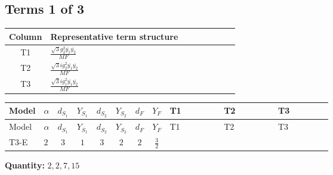 \documentclass[8pt]{article}
\begin{document}
\begin{landscape}
\subsection*{Terms 1 of 3}
\begin{center}
\begin{tabular}{@{}c >{\raggedright\arraybackslash}p{0.82\linewidth}@{}}
\toprule
Column & Representative term structure \\
\midrule
T1 & \(\displaystyle \frac{\sqrt{3} g_{2}^{2} \overline{y_{1}} \overline{y_{2}}}{MF}\) \\
\midrule
T2 & \(\displaystyle \frac{\sqrt{3} i g_{2}^{2} \overline{y_{1}} \overline{y_{2}}}{MF}\) \\
\midrule
T3 & \(\displaystyle \frac{\sqrt{3} i g_{1}^{2} \overline{y_{1}} \overline{y_{2}}}{MF}\) \\
\midrule
\bottomrule
\end{tabular}
\end{center}
\smallskip
\tiny
\begin{longtable}{@{}llcccccc >{\raggedright\arraybackslash}p{0.21\linewidth} >{\raggedright\arraybackslash}p{0.21\linewidth} >{\raggedright\arraybackslash}p{0.21\linewidth}@{}}
\toprule
Model & $\alpha$ & $d_{S_1}$ & $Y_{S_1}$ & $d_{S_2}$ & $Y_{S_2}$ & $d_F$ & $Y_F$ & T1 & T2 & T3 \\
\midrule
\endfirsthead
\toprule
Model & $\alpha$ & $d_{S_1}$ & $Y_{S_1}$ & $d_{S_2}$ & $Y_{S_2}$ & $d_F$ & $Y_F$ & T1 & T2 & T3 \\
\midrule
\endhead
T3-E & $2$ & $3$ & $1$ & $3$ & $2$ & $2$ & $\frac{3}{2}$ & \scriptsize\adjustbox{max width=\linewidth}{$\begin{gathered} \frac{\sqrt{3} g_{2}^{2} \overline{y_{1}} \overline{y_{2}}}{6 MF}\end{gathered}$} & \scriptsize\adjustbox{max width=\linewidth}{$\begin{gathered} - \frac{49 \sqrt{3} i g_{2}^{2} \overline{y_{1}} \overline{y_{2}}}{24 MF}\end{gathered}$} & \scriptsize\adjustbox{max width=\linewidth}{$\begin{gathered} - \frac{9 \sqrt{3} i g_{1}^{2} \overline{y_{1}} \overline{y_{2}}}{8 MF}\end{gathered}$} \\
\midrule
\bottomrule
\end{longtable}
\clearpage
\noindent\textbf{Quantity: }$\mathrm{2,2,7,15}$\par\smallskip

\end{landscape}
\end{document}
